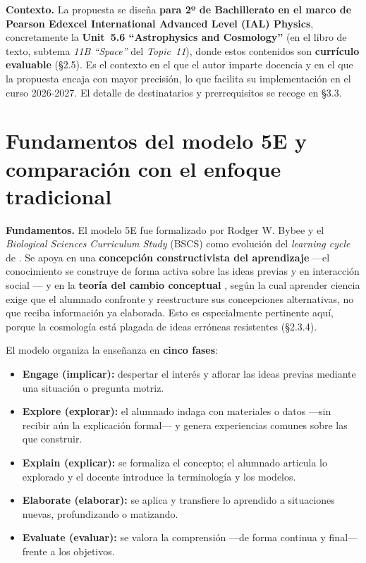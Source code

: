 \textbf{Contexto.} La propuesta se diseña \textbf{para 2º de Bachillerato en el marco de Pearson Edexcel International Advanced Level (IAL) Physics}, concretamente la \textbf{Unit~5.6 ``Astrophysics and Cosmology''} (en el libro de texto, subtema \textit{11B ``Space''} del \textit{Topic~11}), donde estos contenidos son \textbf{currículo evaluable} (§2.5). Es el contexto en el que el autor imparte docencia y en el que la propuesta encaja con mayor precisión, lo que facilita su implementación en el curso 2026-2027. El detalle de destinatarios y prerrequisitos se recoge en §3.3.

\section{Fundamentos del modelo 5E y comparación con el enfoque tradicional}\label{sec:fundamentos5e}

\textbf{Fundamentos.} El modelo 5E fue formalizado por Rodger W. Bybee y el \textit{Biological Sciences Curriculum Study} (BSCS) \parencite{bybee2006} como evolución del \textit{learning cycle} de \textcite{atkin1962}. Se apoya en una \textbf{concepción constructivista del aprendizaje} ---el conocimiento se construye de forma activa sobre las ideas previas \parencite{piaget1964} y en interacción social \parencite{vygotsky1978}--- y en la \textbf{teoría del cambio conceptual} \parencite{posner1982}, según la cual aprender ciencia exige que el alumnado confronte y reestructure sus concepciones alternativas, no que reciba información ya elaborada. Esto es especialmente pertinente aquí, porque la cosmología está plagada de ideas erróneas resistentes (§2.3.4).

El modelo organiza la enseñanza en \textbf{cinco fases}:

\begin{itemize}
\item \textbf{Engage (implicar):} despertar el interés y aflorar las ideas previas mediante una situación o pregunta motriz.
\item \textbf{Explore (explorar):} el alumnado indaga con materiales o datos ---sin recibir aún la explicación formal--- y genera experiencias comunes sobre las que construir.
\item \textbf{Explain (explicar):} se formaliza el concepto; el alumnado articula lo explorado y el docente introduce la terminología y los modelos.
\item \textbf{Elaborate (elaborar):} se aplica y transfiere lo aprendido a situaciones nuevas, profundizando o matizando.
\item \textbf{Evaluate (evaluar):} se valora la comprensión ---de forma continua y final--- frente a los objetivos.
\end{itemize}

